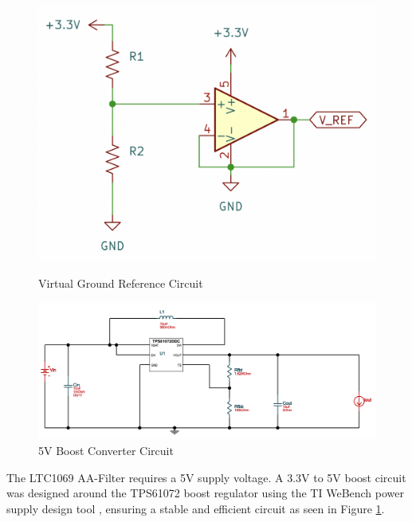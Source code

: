 \begin{figure}[H]
    \centering
    \begin{minipage}{0.35\textwidth}
        \centering
        \includegraphics[width=\textwidth]{Vground.png}
        \caption[Virtual Ground Reference Circuit]{\newline Virtual Ground Reference Circuit}
        \label{fig:virtual_ground}
    \end{minipage}\hfill
    \begin{minipage}{0.6\textwidth}
        \centering
        \includegraphics[width=\textwidth]{5V_Reg.png}
        \caption{5V Boost Converter Circuit}
        \label{fig:5V_reg}
    \end{minipage}
\end{figure}

The LTC1069 AA-Filter requires a 5V supply voltage. A 3.3V to 5V boost circuit was designed around the TPS61072 boost regulator using the TI WeBench power supply design tool \cite{WEBENCHCIRCUITDESIGNERDesignTool}, ensuring a stable and efficient circuit as seen in Figure \ref{fig:5V_reg}. 

